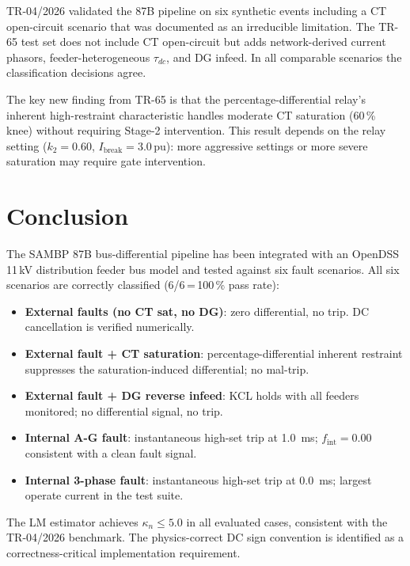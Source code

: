 \documentclass[12pt,a4paper]{article}
\newcommand{\kappan}{\kappa_n}
\newcommand{\fint}{f_{\mathrm{int}}}
\begin{document}
TR-04/2026 validated the 87B pipeline on six synthetic events including a
CT open-circuit scenario that was documented as an irreducible limitation.
The TR-65 test set does not include CT open-circuit but adds network-derived
current phasors, feeder-heterogeneous $\tau_{dc}$, and DG infeed.  In all
comparable scenarios the classification decisions agree.

The key new finding from TR-65 is that the percentage-differential relay's
inherent high-restraint characteristic handles moderate CT saturation
(60\,\% knee) without requiring Stage-2 intervention.  This result
depends on the relay setting ($k_2 = 0.60$, $I_{\mathrm{break}} = 3.0$\,pu):
more aggressive settings or more severe saturation may require gate intervention.

\section{Conclusion}
\label{sec:conclusion}

The SAMBP 87B bus-differential pipeline has been integrated with an OpenDSS
11\,kV distribution feeder bus model and tested against six fault scenarios.
All six scenarios are correctly classified (6/6\,=\,100\,\% pass rate):

\begin{itemize}
  \item \textbf{External faults (no CT sat, no DG)}: zero differential,
    no trip. DC cancellation is verified numerically.
  \item \textbf{External fault + CT saturation}: percentage-differential
    inherent restraint suppresses the saturation-induced differential;
    no mal-trip.
  \item \textbf{External fault + DG reverse infeed}: KCL holds with all
    feeders monitored; no differential signal, no trip.
  \item \textbf{Internal A-G fault}: instantaneous high-set trip at
    \SI{1.0}{\milli\second}; $\fint = 0.00$ consistent with a clean fault
    signal.
  \item \textbf{Internal 3-phase fault}: instantaneous high-set trip at
    \SI{0.0}{\milli\second}; largest operate current in the test suite.
\end{itemize}

\noindent The LM estimator achieves $\kappan \leq 5.0$ in all evaluated cases,
consistent with the TR-04/2026 benchmark.  The physics-correct DC sign
convention is identified as a correctness-critical implementation requirement.
\end{document}
